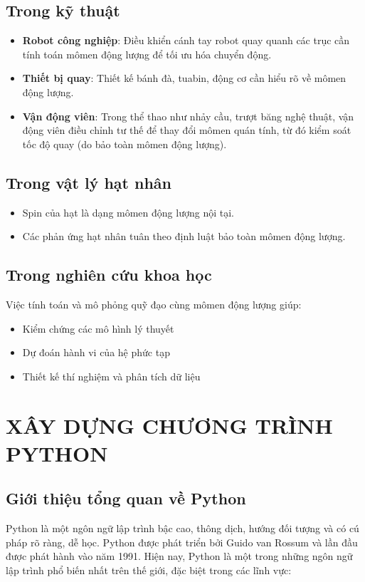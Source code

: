 \documentclass{report}
\begin{document}
\section{Trong kỹ thuật}
\begin{itemize}
    \item \justifying \textbf{Robot công nghiệp}: Điều khiển cánh tay robot quay quanh các trục cần tính toán mômen động lượng để tối ưu hóa chuyển động.
    \item \justifying \textbf{Thiết bị quay}: Thiết kế bánh đà, tuabin, động cơ cần hiểu rõ về mômen động lượng.
    \item \justifying \textbf{Vận động viên}: Trong thể thao như nhảy cầu, trượt băng nghệ thuật, vận động viên điều chỉnh tư thế để thay đổi mômen quán tính, từ đó kiểm soát tốc độ quay (do bảo toàn mômen động lượng).
\end{itemize}

\section{Trong vật lý hạt nhân}
\begin{itemize}
    \item \justifying Spin của hạt là dạng mômen động lượng nội tại.
    \item \justifying Các phản ứng hạt nhân tuân theo định luật bảo toàn mômen động lượng.
\end{itemize}

\section{Trong nghiên cứu khoa học}
\justifying Việc tính toán và mô phỏng quỹ đạo cùng mômen động lượng giúp:
\begin{itemize}
    \item \justifying Kiểm chứng các mô hình lý thuyết
    \item \justifying Dự đoán hành vi của hệ phức tạp
    \item \justifying Thiết kế thí nghiệm và phân tích dữ liệu
\end{itemize}

\chapter{XÂY DỰNG CHƯƠNG TRÌNH PYTHON}

\section{Giới thiệu tổng quan về Python}
Python là một ngôn ngữ lập trình bậc cao, thông dịch, hướng đối tượng và có cú pháp rõ ràng, dễ học. Python được phát triển bởi Guido van Rossum và lần đầu được phát hành vào năm 1991. Hiện nay, Python là một trong những ngôn ngữ lập trình phổ biến nhất trên thế giới, đặc biệt trong các lĩnh vực:
\end{document}
